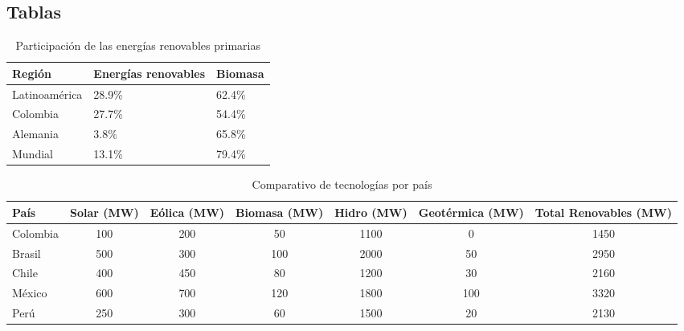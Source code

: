 \subsection*{Tablas}
\begin{table}[H]
\centering
\caption{Participación de las energías renovables primarias}
\begin{tabular}{|l|l|l|}
\hline
Región & Energías renovables & Biomasa \\
\hline
Latinoamérica & 28.9\% & 62.4\% \\
Colombia & 27.7\% & 54.4\% \\
Alemania & 3.8\% & 65.8\% \\
Mundial & 13.1\% & 79.4\% \\
\hline
\end{tabular}
\end{table}


\clearpage
\thispagestyle{empty}
\begin{landscape}
\begin{table}[H]
\centering
\caption{Comparativo de tecnologías por país}
\begin{tabular}{|l|c|c|c|c|c|c|}
\hline
País & Solar (MW) & Eólica (MW) & Biomasa (MW) & Hidro (MW) & Geotérmica (MW) & Total Renovables (MW) \\
\hline
Colombia & 100 & 200 & 50 & 1100 & 0 & 1450 \\
Brasil & 500 & 300 & 100 & 2000 & 50 & 2950 \\
Chile & 400 & 450 & 80 & 1200 & 30 & 2160 \\
México & 600 & 700 & 120 & 1800 & 100 & 3320 \\
Perú & 250 & 300 & 60 & 1500 & 20 & 2130 \\
\hline
\end{tabular}
\end{table}
\end{landscape}